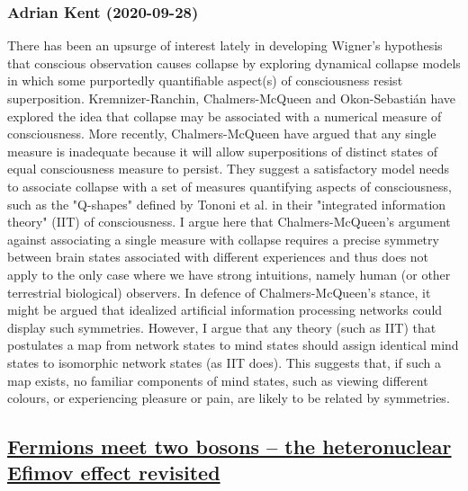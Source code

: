 \subsubsection*{Adrian Kent (2020-09-28)}
There has been an upsurge of interest lately in developing Wigner's
hypothesis that conscious observation causes collapse by exploring dynamical
collapse models in which some purportedly quantifiable aspect(s) of
consciousness resist superposition. Kremnizer-Ranchin, Chalmers-McQueen and
Okon-Sebasti\'an have explored the idea that collapse may be associated with a
numerical measure of consciousness. More recently, Chalmers-McQueen have argued
that any single measure is inadequate because it will allow superpositions of
distinct states of equal consciousness measure to persist. They suggest a
satisfactory model needs to associate collapse with a set of measures
quantifying aspects of consciousness, such as the "Q-shapes" defined by Tononi
et al. in their "integrated information theory" (IIT) of consciousness. I argue
here that Chalmers-McQueen's argument against associating a single measure with
collapse requires a precise symmetry between brain states associated with
different experiences and thus does not apply to the only case where we have
strong intuitions, namely human (or other terrestrial biological) observers. In
defence of Chalmers-McQueen's stance, it might be argued that idealized
artificial information processing networks could display such symmetries.
However, I argue that any theory (such as IIT) that postulates a map from
network states to mind states should assign identical mind states to isomorphic
network states (as IIT does). This suggests that, if such a map exists, no
familiar components of mind states, such as viewing different colours, or
experiencing pleasure or pain, are likely to be related by symmetries.

\subsection*{\href{http://arxiv.org/abs/2009.13221v1}{Fermions meet two bosons -- the heteronuclear Efimov effect revisited}}
